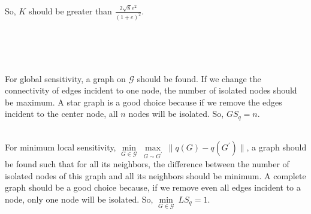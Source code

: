 \documentclass[12pt]{extarticle}
\begin{document}
So, \(K\) should be greater than \(\frac{2\sqrt{8}e^2}{(1+e)^2}\).
\\\\
\\\\
For global sensitivity, a graph on \(\mathcal{G}\) should be found. If we change the connectivity of edges incident to one node, the number of isolated nodes should be maximum. A star graph is a good choice because if we remove the edges incident to the center node, all \(n\) nodes will be isolated. So, \(GS_q = n\).
\\\\
 For minimum local sensitivity, $\underset{G\in\mathcal{G}}{\min}\ \underset{G\sim G^{'}}{\max}\ \| q(G) - q(G^{'})\|$, a graph should be found such that for all its neighbors, the difference between the number of isolated nodes of this graph and all its neighbors should be minimum. A complete graph should be a good choice because, if we remove even all edges incident to a node, only one node will be isolated. So, \(\underset{G\in\mathcal{G}}{\min}\ LS_q = 1\).
\end{document}
